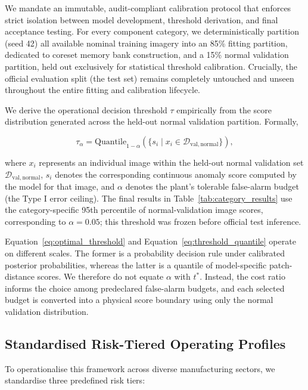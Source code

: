 We mandate an immutable, audit-compliant calibration protocol that enforces strict isolation between model development, threshold derivation, and final acceptance testing. For every component category, we deterministically partition (seed 42) all available nominal training imagery into an 85\% fitting partition, dedicated to coreset memory bank construction, and a 15\% normal validation partition, held out exclusively for statistical threshold calibration. Crucially, the official evaluation split (the test set) remains completely untouched and unseen throughout the entire fitting and calibration lifecycle.

We derive the operational decision threshold $\tau$ empirically from the score distribution generated across the held-out normal validation partition. Formally,

\begin{equation}
    \tau_{\alpha} = \mathrm{Quantile}_{1 - \alpha}\!\left(\{s_i \mid x_i \in \mathcal{D}_{\mathrm{val, normal}}\}\right),
    \label{eq:threshold_quantile}
\end{equation}

where $x_i$ represents an individual image within the held-out normal validation set $\mathcal{D}_{\mathrm{val, normal}}$, $s_i$ denotes the corresponding continuous anomaly score computed by the model for that image, and $\alpha$ denotes the plant's tolerable false-alarm budget (the Type I error ceiling). The final results in Table~\ref{tab:category_results} use the category-specific 95th percentile of normal-validation image scores, corresponding to $\alpha = 0.05$; this threshold was frozen before official test inference.

Equation~\ref{eq:optimal_threshold} and Equation~\ref{eq:threshold_quantile} operate on different scales. The former is a probability decision rule under calibrated posterior probabilities, whereas the latter is a quantile of model-specific patch-distance scores. We therefore do not equate $\alpha$ with $t^*$. Instead, the cost ratio informs the choice among predeclared false-alarm budgets, and each selected budget is converted into a physical score boundary using only the normal validation distribution.

\subsection{Standardised Risk-Tiered Operating Profiles}

To operationalise this framework across diverse manufacturing sectors, we standardise three predefined risk tiers:

